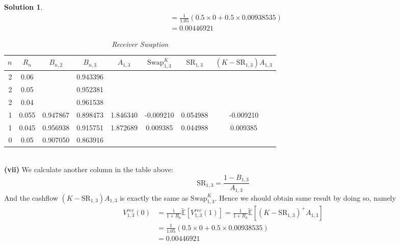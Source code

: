\documentclass[a4paper, 10pt]{article}
\renewcommand{\arraystretch}{1.4}
\theoremstyle{definition}
\theoremstyle{hSol}
\newtheorem*{solution}{Solution}
\begin{document}
\begin{solution}
\begin{equation}
\begin{split}
      &=\frac{1}{1.05}\left(0.5\times0 + 0.5\times0.00938535  \right) \\
      &=0.00446921
  \end{split}
\end{equation}
\begin{table}[H]
\vspace{-1pt}
\caption{\textit{Receiver Swaption}}
\vspace{-7pt}
\centering
\def\arraystretch{1.15}
\begin{tabular}{|r|ccccc|cc|}
\hline
$n$ & $R_n$ & $B_{n,2}$& $B_{n,3}$ &$A_{1,3}$ & $\text{Swap}_{1,3}^{K}$ & $\text{SR}_{1,3}$ & $(K-\text{SR}_{1,3})A_{1,3}$\\ 
\hline
2 & 0.06 &  & 0.943396 & & &&\\
2 & 0.05 &  & 0.952381 & & &&\\
2 & 0.04 &  & 0.961538 & & &&\\
\hline
1 & 0.055 & 0.947867 & 0.898473 & 1.846340 & -0.009210 & 0.054988 & -0.009210\\
1 & 0.045 & 0.956938 & 0.915751 & 1.872689 & 0.009385 & 0.044988 & 0.009385\\
\hline
0 & 0.05 & 0.907050 & 0.863916 & & & &\\
\hline
\end{tabular}
\label{tab:swpt3}
\end{table}
~\\
\textbf{(vii)} We calculate another column in the table above:
$$
\text{SR}_{1,3} = \frac{1-B_{1,3}}{A_{1,3}}
$$
And the cashflow $(K-\text{SR}_{1,3})A_{1,3}$ is exactly the same as $\text{Swap}_{1,3}^{K}$. Hence we should obtain same result by doing so, namely
\begin{equation}
  \begin{split}
    V_{1,3}^{rec}(0) &= \frac{1}{1+R_0} \tilde{\mathbb{E}}\left[V_{1,3}^{rec}(1)\right] = \frac{1}{1+R_0} \tilde{\mathbb{E}}\left[(K-\text{SR}_{1,3})^+A_{1,3}\right]\\
      &=\frac{1}{1.05}\left(0.5\times0 + 0.5\times0.00938535  \right) \\
      &=0.00446921
  \end{split}
\end{equation}


\end{solution}
\end{document}
